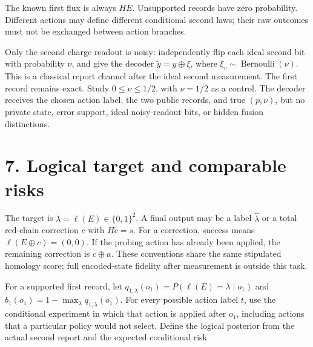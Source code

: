 \documentclass[11pt,letterpaper]{article}
\newcommand{\displayfit}[1]{\sbox{\mathbox}{$\displaystyle #1$}\ifdim\wd\mathbox>\linewidth\resizebox{\linewidth}{!}{\usebox{\mathbox}}\else\usebox{\mathbox}\fi}
\begin{document}
\begin{center}\displayfit{P(z,y\mid E,a)=\|M_0(y)X(a)M_{HE}(z)X(E)|\psi_0\rangle\|^2.}\end{center}

The known first flux is always $HE$. Unsupported records have zero probability. Different actions may define different conditional second laws; their raw outcomes must not be exchanged between action branches.\par

Only the second charge readout is noisy: independently flip each ideal second bit with probability $\nu$, and give the decoder $\widetilde y=y\oplus\xi$, where $\xi_v\sim\operatorname{Bernoulli}(\nu)$. This is a classical report channel after the ideal second measurement. The first record remains exact. Study $0\leq\nu\leq1/2$, with $\nu=1/2$ as a control. The decoder receives the chosen action label, the two public records, and true $(p,\nu)$, but no private state, error support, ideal noisy-readout bits, or hidden fusion distinctions.\par

\section*{7. Logical target and comparable risks}

The target is $\lambda=\ell(E)\in\{0,1\}^2$. A final output may be a label $\widehat\lambda$ or a total red-chain correction $c$ with $Hc=s$. For a correction, success means $\ell(E\oplus c)=(0,0)$. If the probing action has already been applied, the remaining correction is $c\oplus a$. These conventions share the same stipulated homology score; full encoded-state fidelity after measurement is outside this task.\par

For a supported first record, let $q_{1,\lambda}(o_1)=P(\ell(E)=\lambda\mid o_1)$ and $b_1(o_1)=1-\max_\lambda q_{1,\lambda}(o_1)$. For every possible action label $t$, use the conditional experiment in which that action is applied after $o_1$, including actions that a particular policy would not select. Define the logical posterior from the actual second report and the expected conditional risk\par

\begin{center}\displayfit{q_{t,\lambda}(o_1,\widetilde y)=P(\ell(E)=\lambda\mid o_1,t,\widetilde y).}\end{center}
\end{document}
